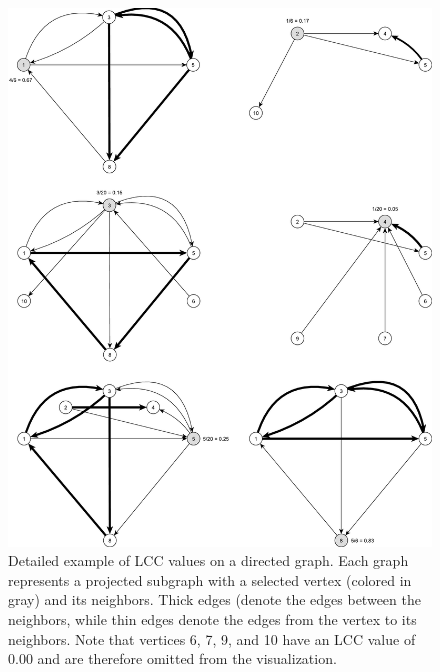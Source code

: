 \begin{figure}[h]
	\centering
	\includegraphics[scale=\examplescale]{figures/examples/lcc-dir-example-detailed.pdf}
	\caption{Detailed example of LCC values on a directed graph. Each graph represents a projected subgraph with a selected vertex (colored in gray) and its neighbors.
			Thick edges (denote the edges between the neighbors, while thin edges denote the edges from the vertex to its neighbors.
			Note that vertices 6, 7, 9, and 10 have an LCC value of 0.00 and are therefore omitted from the visualization.}
	\label{fig:lcc_dir_example_detailed}
\end{figure}
